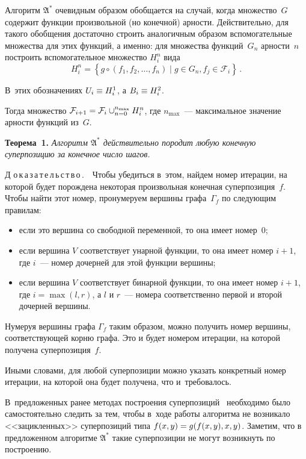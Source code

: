 \begin{multicols}{2}
Алгоритм $\mathfrak{A^*}$ очевидным образом обобщается на случай, когда
множество~$G$ содержит функции произвольной (но конечной) арности.
Действительно, для такого обобщения достаточно строить аналогичным образом
вспомогательные множества для этих функций, а именно: для множества функций~$G_n$ 
арности~$n$ построить вспомогательное множество $H_i^n$ вида
$$
H_i^n = \left\{ g \circ (f_1, f_2, \dots, f_n) \mid g \in G_n, f_j \in \mathcal{F}_i \right\}\,.
$$

В~этих обозначениях $U_i \hm\equiv H_i^1$, а $B_i \hm\equiv H_i^2$.

Тогда множество $\mathcal{F}_{i+1} \hm= \mathcal{F}_i \cup_{n=0}^{n_{\max}} H_i^n$,
где $n_{\max}$~--- максимальное значение арности функций из~$G$.

\smallskip

\noindent
\textbf{Теорема~1.}
\textit{Алгоритм $\mathfrak{A^*}$ действительно породит любую конечную суперпозицию
  за конечное число шагов.}

\smallskip

\noindent
Д\,\,о\,к\,а\,з\,а\,т\,е\,л\,ь\,с\,т\,в\,о\,.\ \ 
  Чтобы убедиться в~этом, \mbox{найдем} номер итерации, на которой будет по\-рож\-де\-на
  некоторая произвольная конечная суперпозиция~$f$. Чтобы найти этот номер,
  пронумеруем вершины графа~$\Gamma_f$ по следующим правилам:
  \begin{itemize}
    \item если это вершина со свободной переменной, то она имеет номер~0;
    \item если вершина $V$ соответствует унарной функции, то она имеет номер
      $i+1$, где $i$~--- номер дочерней для этой функции вершины;
    \item если вершина $V$ соответствует бинарной функции, то она имеет номер
      $i+1$, где $i = \max (l, r)$, а $l$ и $r$~--- номера соответственно
      первой и второй дочерней вершины.
  \end{itemize}

  Нумеруя вершины графа $\Gamma_f$ таким образом, можно получить номер вершины,
  соответ\-ст\-ву\-ющей корню графа. Это и будет номером итерации, на которой получена
  суперпозиция~$f$.

  Иными словами, для любой суперпозиции можно указать конкретный номер
  итерации, на которой она будет получена, что и~требовалось.


\smallskip

В~предложенных ранее методах построения суперпозиций~\cite{Zelinka2008}
необходимо было самостоятельно следить за тем, чтобы в~ходе работы алгоритма
не возникало <<зацикленных>> суперпозиций типа $f(x, y) \hm= g (f(x, y), x, y)$.
Заметим, что в предложенном алгоритме $\mathfrak{A^*}$ такие суперпозиции
не могут возникнуть по построению.


\end{multicols}
